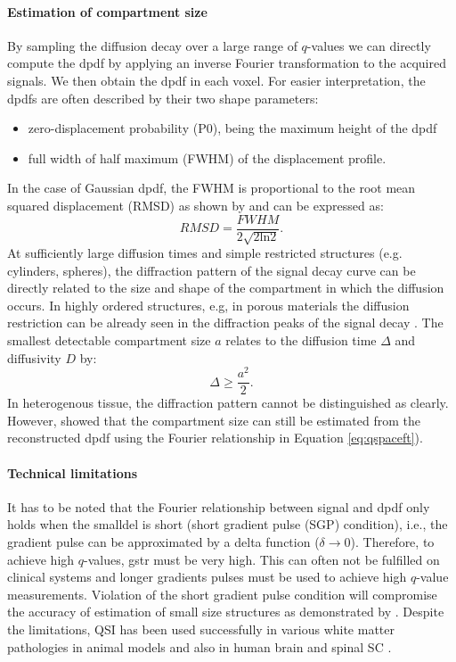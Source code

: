 \paragraph*{Estimation of compartment size}
By sampling the diffusion decay over a large range of $q$-values we can directly compute the  {\gls{dpdf}} by applying an inverse Fourier transformation to the acquired signals. We then obtain the  {\gls{dpdf}} in each voxel. For easier interpretation, the  {\gls{dpdf}}s are often described by their two shape parameters:
\begin{itemize}
	\item zero-displacement probability (\gls{P0}), being the maximum height of the  {\gls{dpdf}}
	\item full width of half maximum (\gls{FWHM}) of the displacement profile.
\end{itemize}
In the case of Gaussian  {\gls{dpdf}}, the \gls{FWHM} is proportional to the root mean squared displacement (RMSD) as shown by \citet{Cory:1990} and can be expressed as:
\begin{equation}
	RMSD = \frac{FWHM}{2\sqrt{2\mbox{ln}2}}.
\end{equation}
At sufficiently large diffusion times and simple restricted structures (e.g. cylinders, spheres), the diffraction pattern of the signal decay curve can be directly related to the size and shape of the compartment in which the diffusion occurs. In highly ordered structures, e.g, in porous materials the diffusion restriction can be already seen in the diffraction peaks of the signal decay \citep{Callaghan:1996}. The smallest detectable compartment size $a$ relates to the diffusion time $\Delta$ and diffusivity $D$ by:
\begin{equation}
	\Delta \ge \frac{a^2}{2}.
\end{equation}   
In heterogenous tissue, the diffraction pattern cannot be distinguished as clearly. However, \citet{Cory:1990} showed that the compartment size can still be estimated from the reconstructed  {\gls{dpdf}} using the Fourier relationship in Equation \ref{eq:qspaceft}). 
\paragraph*{Technical limitations}
It has to be noted that the Fourier relationship between signal and  {\gls{dpdf}} only holds when the {\gls{smalldel}} is short (short gradient pulse (SGP) condition), i.e., the gradient pulse can be approximated by a delta function ($\delta\rightarrow 0$). Therefore, to achieve high $q$-values, \gls{gstr} must be very high. This can often not be fulfilled on clinical systems and longer gradients pulses must be used to achieve high $q$-value measurements. Violation of the short gradient pulse condition will compromise the accuracy of estimation of small size structures as demonstrated by \cite{Linse:1995, Latt:2007}. Despite the limitations, \gls{QSI} has been used successfully in various white matter pathologies in animal models \citep{Ong:2008} and also in human brain \citep{Assaf:2002} and spinal {\gls{SC}} \citep{Assaf:2000, Farrell:2008}.

